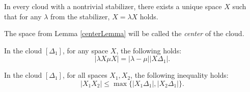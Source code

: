 \documentclass[11pt,twoside
]{article}
\begin{document}
\begin{lemma}
  In every cloud with a nontrivial stabilizer, there exists a
  unique space $X$ such that for any $\lambda$ from the stabilizer,
  $X = \lambda X$ holds.
  \label{centerLemma}
\end{lemma}
\begin{definition}
  The space from Lemma \ref{centerLemma} will be called the
  \emph{center} of the cloud.
\end{definition}
\begin{remark} In the cloud $[\Delta_1]$, for any space $X$, the
  following holds:
  $$|\lambda X \mu X| = |\lambda - \mu||X\Delta_1|.$$
\end{remark}
\begin{remark} In the cloud $[\Delta_{1}]$,
  for all spaces $X_{1}, X_{2}$, the following inequality holds:
  $$|X_{1}X_{2}| \le \max\big\{|X_{1} \Delta_{1}|,|X_{2}\Delta_{1}|\big\}.$$
  \label{remUltraMetric}
\end{remark}
\end{document}

